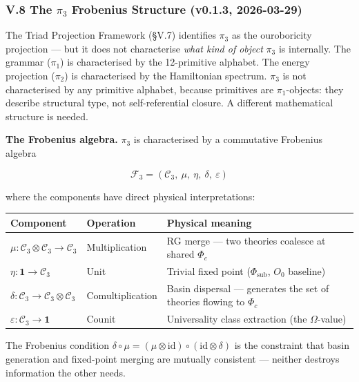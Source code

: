 \documentclass[12pt,a4paper]{article}
\newcommand{\pilcrow}{\S}
\begin{document}
\subsubsection{V.8 The $\pi_3$ Frobenius Structure (v0.1.3, 2026-03-29)}

The Triad Projection Framework (\pilcrow{}V.7) identifies $\pi_3$ as the ouroboricity projection --- but it does not characterise \emph{what kind of object} $\pi_3$ is internally. The grammar ($\pi_1$) is characterised by the 12-primitive alphabet. The energy projection ($\pi_2$) is characterised by the Hamiltonian spectrum. $\pi_3$ is not characterised by any primitive alphabet, because primitives are $\pi_1$-objects: they describe structural type, not self-referential closure. A different mathematical structure is needed.

\textbf{The Frobenius algebra.} $\pi_3$ is characterised by a commutative Frobenius algebra

\[\mathcal{F}_3 = (\mathcal{C}_3,\ \mu,\ \eta,\ \delta,\ \varepsilon)\]

where the components have direct physical interpretations:

\begin{table}[htbp]
\centering
\small
{}
\begin{tabularx}{\textwidth}{>{\centering\arraybackslash}X >{\centering\arraybackslash}X >{\centering\arraybackslash}X}
\toprule
\rowcolor{gray!25}\textbf{Component} & \textbf{Operation} & \textbf{Physical meaning} \\
\midrule
\rowcolors{1}{white}{gray!10}
$\mu : \mathcal{C}_3 \otimes \mathcal{C}_3 \to \mathcal{C}_3$ & Multiplication & RG merge --- two theories coalesce at shared $\Phi_c$ \\
$\eta : \mathbf{1} \to \mathcal{C}_3$ & Unit & Trivial fixed point ($\Phi_\text{sub}$, $O_0$ baseline) \\
$\delta : \mathcal{C}_3 \to \mathcal{C}_3 \otimes \mathcal{C}_3$ & Comultiplication & Basin dispersal --- generates the set of theories flowing to $\Phi_c$ \\
$\varepsilon : \mathcal{C}_3 \to \mathbf{1}$ & Counit & Universality class extraction (the $\Omega$-value) \\
\bottomrule
\end{tabularx}
\end{table}

The Frobenius condition $\delta \circ \mu = (\mu \otimes \text{id}) \circ (\text{id} \otimes \delta)$ is the constraint that basin generation and fixed-point merging are mutually consistent --- neither destroys information the other needs.
\end{document}
